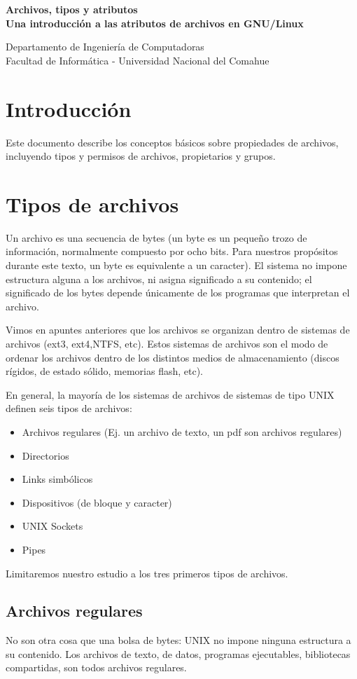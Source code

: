 \documentclass[12pt]{article}
\def\maketitle{

 \makeatletter
 {\color{bl} \centering \huge \sc \textbf{
Archivos, tipos y atributos \\
\large \vspace*{-8pt} \color{black} Una introducción a las atributos de archivos en GNU/Linux
 \vspace*{8pt} }\par}
 \makeatother


 \makeatletter
 {\centering \small 
 	Departamento de Ingeniería de Computadoras \\
 	Facultad de Informática - Universidad Nacional del Comahue \\
 	\vspace{20pt} }
 \makeatother

}
\begin{document}
\thispagestyle{empty}
\maketitle
\setlength{\parindent}{0pt}


\section*{Introducción}
Este documento describe los conceptos básicos sobre propiedades de archivos, 
incluyendo tipos y permisos de archivos, propietarios y grupos. 

\section*{Tipos de archivos}

Un archivo es una secuencia de bytes (un byte es un pequeño trozo de 
información, normalmente compuesto por ocho bits. Para nuestros propósitos
durante este texto, un byte es equivalente a un caracter). El sistema no impone 
estructura alguna a los archivos, ni asigna significado a su contenido; el 
significado de los bytes depende únicamente de los programas que 
interpretan el archivo. 

Vimos en apuntes anteriores que los archivos se organizan dentro de sistemas de 
archivos (ext3, ext4,NTFS, etc). Estos sistemas de archivos son el modo de 
ordenar los archivos dentro de los distintos medios de almacenamiento (discos
rígidos, de estado sólido, memorias flash, etc). 

En general, la mayoría de los sistemas de archivos de sistemas de tipo UNIX
definen seis tipos de archivos:

\begin{itemize}
\item Archivos regulares (Ej. un archivo de texto, un pdf son archivos regulares)
\item Directorios
\item Links simbólicos
\item Dispositivos (de bloque y caracter) 
\item UNIX Sockets  
\item Pipes 
\end{itemize}

Limitaremos nuestro estudio a los tres primeros tipos de archivos. 


\subsection*{Archivos regulares}
No son otra cosa que una bolsa de bytes: UNIX no impone ninguna estructura a
su contenido. Los archivos de texto, de datos, programas ejecutables, bibliotecas
compartidas, son todos archivos regulares.
\end{document}
